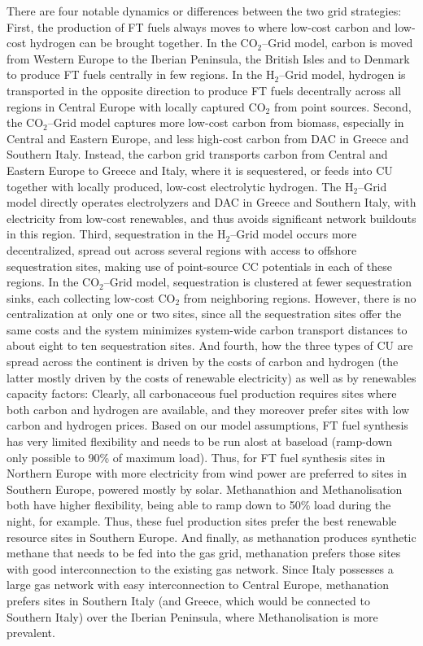 \documentclass[twocolumn]{article}
\newcommand{\carbon}{CO$_2$}
\newcommand{\hydrogen}{H$_2$}
\newcommand{\carbongrid}{\carbon{}--Grid}
\newcommand{\hydrogengrid}{\hydrogen{}--Grid}
\begin{document}
There are four notable dynamics or differences between the two grid strategies:
First, the production of FT fuels always moves to where low-cost carbon and low-cost hydrogen can be brought together. In the \carbongrid{} model, carbon is moved from Western Europe to the Iberian Peninsula, the British Isles and to Denmark to produce FT fuels centrally in few regions. In the \hydrogengrid{} model, hydrogen is transported in the opposite direction to produce FT fuels decentrally across all regions in Central Europe with locally captured \carbon{} from point sources.
Second, the \carbongrid{} model captures more low-cost carbon from biomass, especially in Central and Eastern Europe, and less high-cost carbon from DAC in Greece and Southern Italy. Instead, the carbon grid transports carbon from Central and Eastern Europe to Greece and Italy, where it is sequestered, or feeds into CU together with locally produced, low-cost electrolytic hydrogen. The \hydrogengrid{} model directly operates electrolyzers and DAC in Greece and Southern Italy, with electricity from low-cost renewables, and thus avoids significant network buildouts in this region.
Third, sequestration in the \hydrogengrid{} model occurs more decentralized, spread out across several regions with access to offshore sequestration sites, making use of point-source CC potentials in each of these regions. In the \carbongrid{} model, sequestration is clustered at fewer sequestration sinks, each collecting low-cost \carbon{} from neighboring regions. However, there is no centralization at only one or two sites, since all the sequestration sites offer the same costs and the system minimizes system-wide carbon transport distances to about eight to ten sequestration sites.
And fourth, how the three types of CU are spread across the continent is driven by the costs of carbon and hydrogen (the latter mostly driven by the costs of renewable electricity) as well as by renewables capacity factors: Clearly, all carbonaceous fuel production requires sites where both carbon and hydrogen are available, and they moreover prefer sites with low carbon and hydrogen prices. Based on our model assumptions, FT fuel synthesis has very limited flexibility and needs to be run alost at baseload (ramp-down only possible to 90\% of maximum load). Thus, for FT fuel synthesis sites in Northern Europe with more electricity from wind power are preferred to sites in Southern Europe, powered mostly by solar. Methanathion and Methanolisation both have higher flexibility, being able to ramp down to 50\% load during the night, for example. Thus, these fuel production sites prefer the best renewable resource sites in Southern Europe. And finally, as methanation produces synthetic methane that needs to be fed into the gas grid, methanation prefers those sites with good interconnection to the existing gas network. Since Italy possesses a large gas network with easy interconnection to Central Europe, methanation prefers sites in Southern Italy (and Greece, which would be connected to Southern Italy) over the Iberian Peninsula, where Methanolisation is more prevalent.
\end{document}
